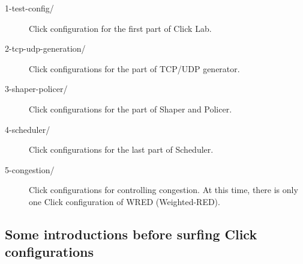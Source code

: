 \documentclass[a4paper]{article}
\begin{document}
\begin{description}
      	\item[1-test-config/] Click configuration for the first part of Click Lab.
      	\item[2-tcp-udp-generation/] Click configurations for the part of TCP/UDP generator.
      	\item[3-shaper-policer/] Click configurations for the part of Shaper and Policer.
      	\item[4-scheduler/] Click configurations for the last part of Scheduler.
      	\item[5-congestion/] Click configurations for controlling congestion. At this time, there is only one Click configuration of WRED (Weighted-RED).
      \end{description}
    
    \subsection{Some introductions before surfing Click configurations}
\end{document}
